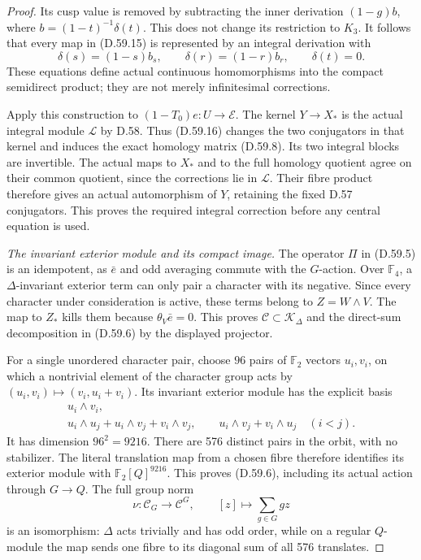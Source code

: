 \begin{proof}
Its cusp value is removed by subtracting
the inner derivation \((1-g)b\), where
\(b=(1-t)^{-1}\delta(t)\). This does not
change its restriction to \(K_3\). It
follows that every map in (D.59.15) is
represented by an integral derivation
with
\[
 \delta(s)=(1-s)b_s,\qquad
 \delta(r)=(1-r)b_r,\qquad \delta(t)=0.
 \tag{D.59.16}
\]
These equations define actual continuous
homomorphisms into the compact semidirect
product; they are not merely infinitesimal
corrections.

Apply this construction to
\((1-T_0)e:U\to\mathscr E\). The kernel
\(Y\to X_*\) is the actual integral module
\(\mathcal L\) by D.58. Thus (D.59.16)
changes the two conjugators in that kernel
and induces the exact homology matrix
(D.59.8). Its two integral blocks are
invertible. The actual maps to \(X_*\)
and to the full homology quotient agree
on their common quotient, since the
corrections lie in \(\mathcal L\).
Their fibre product therefore gives an
actual automorphism of \(Y\), retaining
the fixed D.57 conjugators. This proves
the required integral correction before
any central equation is used.

\emph{The invariant exterior module and its compact image.}
The operator \(\Pi\) in (D.59.5) is an
idempotent, as \(\bar e\) and odd averaging
commute with the \(G\)-action. Over
\(\mathbb F_4\), a \(\Delta\)-invariant
exterior term can only pair a character
with its negative. Since every character
under consideration is active, these
terms belong to \(Z=W\wedge V\).
The map to \(Z_*\) kills them because
\(\theta_V\bar e=0\). This proves
\(\mathcal C\subset\mathcal K_\Delta\)
and the direct-sum decomposition in
(D.59.6) by the displayed projector.

For a single unordered character pair,
choose \(96\) pairs of \(\mathbb F_2\)
vectors \(u_i,v_i\), on which a nontrivial
element of the character group acts by
\((u_i,v_i)\mapsto(v_i,u_i+v_i)\).
Its invariant exterior module has the
explicit basis
\[
 \begin{gathered}
 u_i\wedge v_i,\\
 u_i\wedge u_j+u_i\wedge v_j+v_i\wedge v_j,
 \qquad u_i\wedge v_j+v_i\wedge u_j\quad(i<j).
 \end{gathered}
 \tag{D.59.17}
\]
It has dimension \(96^2=9216\).
There are 576 distinct pairs in the
orbit, with no stabilizer. The literal
translation map from a chosen fibre
therefore identifies its exterior module
with \(\mathbb F_2[Q]^{9216}\).
This proves (D.59.6), including its
actual action through \(G\to Q\).
The full group norm
\[
 \nu:\mathcal C_G\longrightarrow\mathcal C^G,
       \qquad[z]\longmapsto\sum_{g\in G}gz
 \tag{D.59.18}
\]
is an isomorphism: \(\Delta\) acts
trivially and has odd order, while on
a regular \(Q\)-module the map sends
one fibre to its diagonal sum of all
576 translates.


\end{proof}
